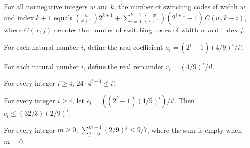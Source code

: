 \begin{theorem}
\label{FABL.SwitchingCode.card_succ}
\leanok
{}
For all nonnegative integers $w$ and $k$, the number of switching codes of width $w$ and
index $k+1$ equals
$\binom{w}{k+1}2^{k+1}+\sum_{i=0}^{k-1}\binom{w}{i+1}(2^{i+1}-1)\,C(w,k-i)$, where
$C(w,j)$ denotes the number of switching codes of width $w$ and index $j$.
\end{theorem}

\begin{definition}
\label{FABL.SwitchingCode.fullCoefficient}
\leanok
For each natural number $i$, define the real coefficient $a_i=(2^i-1)(4/9)^i/i!$.
\end{definition}

\begin{definition}
\label{FABL.SwitchingCode.finalRemainder}
\leanok
For each natural number $i$, define the real remainder $r_i=(4/9)^i/i!$.
\end{definition}

\begin{theorem}
\label{FABL.SwitchingCode.factorial_ge_twentyFour_mul_four_pow}
\leanok
{}
For every integer $i \ge 4$, $24\cdot 4^{i-4} \le i!$.
\end{theorem}

\begin{theorem}
\label{FABL.SwitchingCode.fullCoefficient_tail}
\leanok
{}
For every integer $i \ge 4$, let $c_i=((2^i-1)(4/9)^i)/i!$. Then $c_i \le
(32/3)(2/9)^i$.
\end{theorem}

\begin{theorem}
\label{FABL.SwitchingCode.geometric_two_ninths_bound}
\leanok
{}
For every integer $m \ge 0$, $\sum_{j=0}^{m-1}(2/9)^j \le 9/7$, where the sum is empty
when $m=0$.
\end{theorem}

